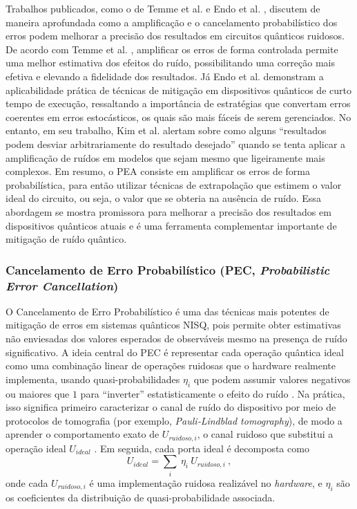 Trabalhos publicados, como o de Temme et al. \citeyear{temme2017_PauliTwirling} e Endo et al. \citeyear{Endo2018_PEA}, discutem de maneira aprofundada como a amplificaç\~{a}o e o cancelamento probabil\'{i}stico dos erros podem melhorar a precis\~{a}o dos resultados em circuitos qu\^{a}nticos ruidosos. De acordo com Temme et al. \citeyear{temme2017_PauliTwirling}, amplificar os erros de forma controlada permite uma melhor estimativa dos efeitos do ru\'{i}do, possibilitando uma correç\~{a}o mais efetiva e elevando a fidelidade dos resultados. J\'{a} Endo et al. \citeyear{Endo2018_PEA} demonstram a aplicabilidade pr\'{a}tica de t\'{e}cnicas de mitigaç\~{a}o em dispositivos qu\^{a}nticos de curto tempo de execuç\~{a}o, ressaltando a import\^{a}ncia de estrat\'{e}gias que convertam erros coerentes em erros estoc\'{a}sticos, os quais s\~{a}o mais f\'{a}ceis de serem gerenciados. No entanto, em seu trabalho, Kim et al. \citeyear{Kim2023_DD_PT_PEA} alertam sobre como alguns “resultados podem desviar arbitrariamente do resultado desejado” quando se tenta aplicar a amplificaç\~{a}o de ru\'{i}dos em modelos que sejam mesmo que ligeiramente mais complexos.
Em resumo, o PEA consiste em amplificar os erros de forma probabil\'{i}stica, para ent\~{a}o utilizar t\'{e}cnicas de extrapolaç\~{a}o que estimem o valor ideal do circuito, ou seja, o valor que se obteria na aus\^{e}ncia de ru\'{i}do. Essa abordagem se mostra promissora para melhorar a precis\~{a}o dos resultados em dispositivos qu\^{a}nticos atuais e \'{e} uma ferramenta complementar importante de mitigaç\~{a}o de ru\'{i}do qu\^{a}ntico.

\subsubsection*{Cancelamento de Erro Probabil\'{i}stico (PEC, \textit{Probabilistic Error Cancellation})}
\label{subSubSec: pec}

O Cancelamento de Erro Probabil\'{i}stico \'{e} uma das t\'{e}cnicas mais potentes de mitigaç\~{a}o de erros em sistemas qu\^{a}nticos NISQ, pois permite obter estimativas n\~{a}o enviesadas dos valores esperados de observ\'{a}veis mesmo na presença de ru\'{i}do significativo. A ideia central do PEC \'{e} representar cada operaç\~{a}o qu\^{a}ntica ideal como uma combinaç\~{a}o linear de operaç\~{o}es ruidosas que o hardware realmente implementa, usando quasi-probabilidades {$\eta_i$} que podem assumir valores negativos ou maiores que $1$ para “inverter” estatisticamente o efeito do ru\'{i}do \cite{Mitiq2025_PEC}.
Na pr\'{a}tica, isso significa primeiro caracterizar o canal de ru\'{i}do do dispositivo por meio de protocolos de tomografia (por exemplo, \textit{Pauli‑Lindblad tomography}), de modo a aprender o comportamento exato de $U_{ruidoso, i}$, o canal ruidoso que substitui a operaç\~{a}o ideal $U_{ideal}$ \cite{Mitiq2025_PEC, IBM2025_PEC}. Em seguida, cada porta ideal \'{e} decomposta como
\begin{equation*}
    U_{ideal} = \sum_i ~\eta_i ~U_{ruidoso, i}~,   
\end{equation*}
%
onde cada $U_{ruidoso, i}$  \'{e} uma implementaç\~{a}o ruidosa realiz\'{a}vel no \textit{hardware}, e $\eta_i$ s\~{a}o os coeficientes da distribuiç\~{a}o de quasi-probabilidade associada.

